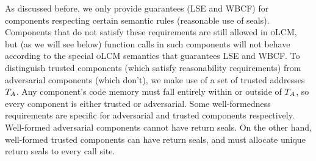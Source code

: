\documentclass[acmsmall,screen]{acmart}\settopmatter{}
\renewcommand{\comp}{\var{comp}}
\newcommand{\wdjud}[2][ ]{#1 \vdash #2}
\newcommand{\srccm}{\textsc{oLCM}}
\newenvironment{jversion}%
    {\color{OliveGreen}}{}
\begin{document}
\begin{jversion}
  As discussed before, we only provide guarantees (LSE and WBCF) for components respecting certain semantic rules (reasonable use of seals).
  Components that do not satisfy these requirements are still allowed in \srccm{}, but (as we will see below) function calls in such components will not behave according to the special \srccm{} semantics that guarantees LSE and WBCF.
  To distinguish trusted components (which satisfy reasonability requirements) from adversarial components (which don't), we make use of a set of trusted addresses $T_{A}$.
  Any component's code memory must fall entirely within or outside of $T_{A}$, so every component is either trusted or adversarial.
  Some well-formedness requirements are specific for adversarial and trusted components respectively.
  Well-formed adversarial components cannot have return seals.
  On the other hand, well-formed trusted components can have return seals, and must allocate unique return seals to every call site.
\end{jversion}

\end{document}
